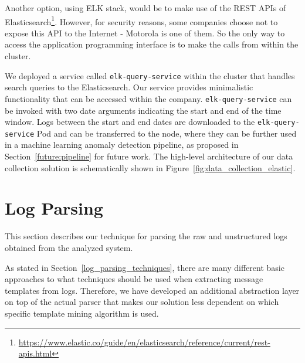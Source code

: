 Another option, using ELK stack, would be to make use of the REST APIs of Elasticsearch\footnote{\url{https://www.elastic.co/guide/en/elasticsearch/reference/current/rest-apis.html}}. However, for security reasons, some companies choose not to expose this API to the Internet - Motorola is one of them.
So the only way to access the application programming interface is to make the calls from within the cluster.

We deployed a service called \texttt{elk-query-service} within the cluster that handles search queries to the Elasticsearch. Our service provides minimalistic functionality that can be accessed within the company.
\texttt{\justify elk-query-service} can be invoked with two date arguments indicating the start and end of the time window. Logs between the start and end dates are downloaded to the \texttt{elk-query-service} Pod and can be transferred to the node, where they can be further used in a machine learning anomaly detection pipeline, as proposed in Section~\ref{future:pipeline} for future work. The high-level architecture of our data collection solution is schematically shown in Figure~\ref{fig:data_collection_elastic}.

\begin{figure}[!tbp] 
\end{figure}

\newpage

\section{Log Parsing}
This section describes our technique for parsing the raw and unstructured logs obtained from the analyzed system.

As stated in Section~\ref{log_parsing_techniques}, there are many different basic approaches to what techniques should be used when extracting message templates from logs. 
Therefore, we have developed an additional abstraction layer on top of the actual parser that makes our solution less dependent on which specific template mining algorithm is used.

